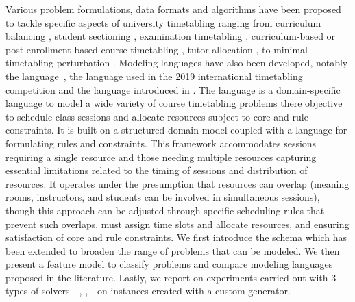 Various problem formulations, data formats and algorithms have been proposed to tackle specific aspects of university timetabling 
ranging from curriculum balancing \cite{2001_castro_ARXIV,2012_chiarandini_JH,2013_rubio_MPE}, student sectioning \cite{2010_muller_AOR,2019_schindl_AOR}, examination timetabling \cite{1996_carter_JORS,2020_battistutta_CPAIOR,2010_mccollum_INFORMS}, curriculum-based or post-enrollment-based course timetabling \cite{2010_mccollum_INFORMS,2015_bettinelli_TOP,2007_lewis_ITC,2012_cambazard_AOR,2017_goh_EJOR,2021_chen_IEEEA}, tutor allocation \cite{2022_caselli_ESWA}, to minimal timetabling perturbation \cite{2019_lindahl_EJOR,2020_lemos_JS}. 
Modeling languages have also been developed, notably the {\XHSTT} language~\cite{2012_ahmadi_AOR}, the {\ITC} language used in the 2019 international timetabling competition \cite{2018_muller_PATAT,2019_ITC} and the {\UTP} language introduced in \cite{2022_barichard_PATAT}.
The {\UTP} language is a domain-specific language to model a wide variety of course timetabling %
problems 
there objective to schedule class sessions and allocate resources
 subject to core and rule constraints. 
%
It is built on a structured domain model coupled with a language for formulating rules and constraints. This framework accommodates sessions requiring a single resource 
and those needing multiple resources 
capturing essential limitations related to the timing of sessions and distribution of resources. 
It operates under the presumption that resources can overlap (meaning rooms, instructors, and students can be involved in simultaneous sessions), though this approach can be adjusted through specific scheduling rules that prevent such overlaps. \UTP{} must assign time slots and allocate resources, and ensuring satisfaction of core and rule constraints. %
%
%
We first introduce the {\UTP} schema which has been extended to broaden the range of problems that can be modeled. 
We then present a feature model to classify problems and compare modeling languages proposed in the literature. 
Lastly, we report on experiments carried out with 3 types of solvers - {\CP}, {\ASP}, {\MIP} -
on instances created with a custom generator. %

